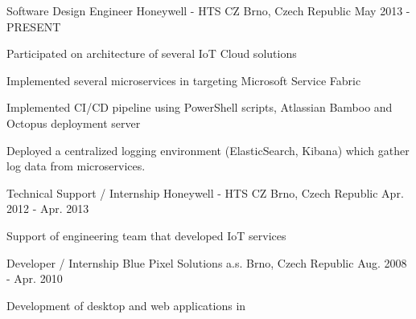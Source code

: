 

\begin{cventries}

  \cventry
    {Software Design Engineer} %
    {Honeywell - HTS CZ} %
    {Brno, Czech Republic} %
    {May 2013 - PRESENT} %
    {
      \begin{cvitems} %
        \item {Participated on architecture of several IoT Cloud solutions}
        \item {Implemented several microservices in \Csharp{} targeting Microsoft Service Fabric}
        \item {Implemented CI/CD pipeline using PowerShell scripts, Atlassian Bamboo and Octopus deployment server}
        \item {Deployed a centralized logging environment (ElasticSearch, Kibana) which gather log data from microservices.}
      \end{cvitems}
    }

  \cventry
    {Technical Support / Internship} %
    {Honeywell - HTS CZ} %
    {Brno, Czech Republic} %
    {Apr. 2012 - Apr. 2013} %
    {
      \begin{cvitems} %
        \item {Support of engineering team that developed IoT services}
      \end{cvitems}
    }

  \cventry
    {\Csharp{} Developer / Internship} %
    {Blue Pixel Solutions a.s.} %
    {Brno, Czech Republic} %
    {Aug. 2008 - Apr. 2010} %
    {
      \begin{cvitems} %
        \item {Development of desktop and web applications in \Csharp{}}
      \end{cvitems}
    }

\end{cventries}
